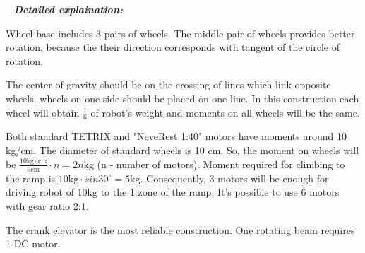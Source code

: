    \newline
  \textit{\textbf{Detailed explaination:}}
  \begin{enumerate*}
  	\item Wheel base includes 3 pairs of wheels. The middle pair of wheels provides better rotation, because the their direction corresponds with tangent of the circle of rotation.
  	
  	The center of gravity should be on the crossing of lines which link opposite wheels. wheels on one side should be placed on one line. In this construction each wheel will obtain $\frac{1}{6}$ of robot's weight and moments on all wheels will be the same. 
  	\begin{figure}[H]
  		\begin{minipage}[h]{1\linewidth}
  			\caption{}
  		\end{minipage}
  	\end{figure}
  	
  	\item Both standard TETRIX and "NeveRest 1:40" motors have moments around 10 kg/cm. The diameter of standard wheels is 10 cm. So, the moment on wheels will be $\frac{10\text{kg} \cdot \text{cm}}{5\text{cm}} \cdot n = 2n\text{kg}$ (n - number of motors). Moment required for climbing to the ramp is $10\text{kg} \cdot sin30^\circ = 5\text{kg}$. Consequently, 3 motors will be enough for driving robot of 10kg to the 1 zone of the ramp. It's possible to use 6 motors with gear ratio 2:1.
  	\item The crank elevator is the most reliable construction. One rotating beam requires 1 DC motor.
  	

\end{enumerate*}
